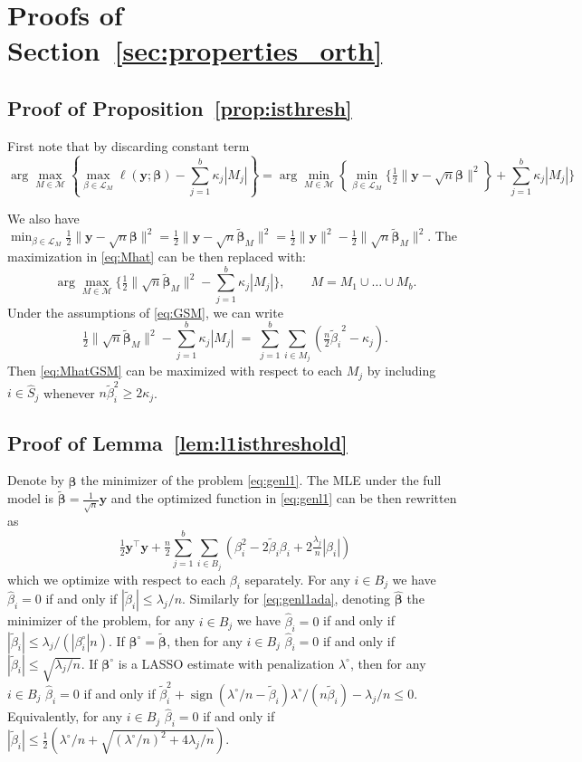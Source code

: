 \documentclass[
  12pt]{article}
\newcommand{\M}{\mathcal{M}}
\newcommand{\by}{\mathbf{y}}
\newcommand{\bbeta}{\boldsymbol{\beta}}
\begin{document}
\section{Proofs of Section~\ref{sec:properties_orth}}\label{suppsec:proofsecgsm}
 
 

\subsection{Proof of Proposition~\ref{prop:isthresh}}
First note that by discarding constant term 
 $$\arg\max_{M\in \M} \left\{\max_{\beta\in \mathcal{L}_M}\ell(\by; \bbeta)-\sum_{j=1}^b\kappa_j |M_j| \right\}=\arg\min_{M\in \M} \left\{\min_{\beta\in \mathcal{L}_M}\bigg\{ \tfrac{1}{2}\|\by-\sqrt{n}\bbeta\|^2\right\}+\sum_{j=1}^b\kappa_j |M_j| \bigg\}$$

 We also have $\min_{\beta\in \mathcal{L}_M} \tfrac{1}{2}\|\by-\sqrt{n}\bbeta\|^2=\tfrac{1}{2}\|\by-\sqrt{n}\tilde{\bbeta}_M\|^2=\tfrac{1}{2}\|\by\|^2-\tfrac{1}{2}\|\sqrt{n}\tilde{\bbeta}_M\|^2$. The maximization in \eqref{eq:Mhat} can be then replaced with:
     \begin{equation}\label{eq:MhatGSM}
  \arg\max_{M\in \M} \bigg\{\tfrac{1}{2}\| \sqrt{n}\tilde{\bbeta}_M\|^2-\sum_{j=1}^b\kappa_j |M_j|\bigg\}, \qquad M=M_1\cup \ldots\cup M_b.	
\end{equation}
Under the assumptions of \eqref{eq:GSM}, we can write 
	$$
	\tfrac{1}{2}\|\sqrt{n}\tilde{\bbeta}_M\|^2-\sum_{j=1}^b\kappa_j |M_j|\;=\;\sum_{j=1}^b\sum_{i\in M_j}(\tfrac{n}{2}{\tilde{ \beta}_i}^2-\kappa_j).
	$$
	Then \eqref{eq:MhatGSM} can be maximized with respect to each $M_j$ by including $i\in \hat S_j$ whenever $n\tilde\beta_i^2\geq 2\kappa_j$.

\subsection{Proof of Lemma~\ref{lem:l1isthreshold}}
    Denote by $\hat{\bbeta}$ the minimizer of the problem \eqref{eq:genl1}. The MLE under the full model is $\tilde{\bbeta}=\tfrac{1}{\sqrt{n}} \by$ and the optimized function in \eqref{eq:genl1} can be then rewritten as
	$$
	\tfrac{1}{2}\by^{\top}\by +\tfrac{n}{2}\sum_{j=1}^b\sum_{i\in B_j}\left(\beta_i^2-2\tilde\beta_i\beta_i+2\tfrac{\lambda_j}{n}|\beta_i|\right)
	$$
	which we optimize with respect to each $\beta_i$ separately. For any $i\in B_j$ we have $\hat\beta_i=0$ if and only if $|\tilde \beta_i|\leq \lambda_j/n$. Similarly  for \eqref{eq:genl1ada}, denoting $\hat{\bbeta}$ the minimizer of the problem, for any $i\in B_j$ we have $\hat\beta_i=0$ if and only if $|\tilde \beta_i|\leq \lambda_j/(|\beta^{\circ}_i|n)$. If $\bbeta^{\circ}= \tilde{\bbeta}$, then for any $i\in B_j$ $\hat{\beta}_i = 0$ if and only if $|\tilde \beta_i|\leq \sqrt{\lambda_j/n}$. If $\bbeta^\circ$ is a LASSO estimate with penalization $\lambda^\circ$, then for any $i\in B_j$ 
 $\hat{\beta}_i = 0$ if and only if $\tilde{\beta}^2_i + \operatorname{sign}(\lambda^{\circ}/n-\tilde{\beta}_i)\lambda^\circ/(n\tilde{\beta}_i)-\lambda_j/n \leq 0$. Equivalently, for any $i\in B_j$ 
 $\hat{\beta}_i = 0$ if and only if $|\tilde{\beta}_ i| \leq  \tfrac{1}{2}\left(\lambda^\circ/n+\sqrt{(\lambda^\circ/n)^2+4 \lambda_j/n}\right)$.
\end{document}
